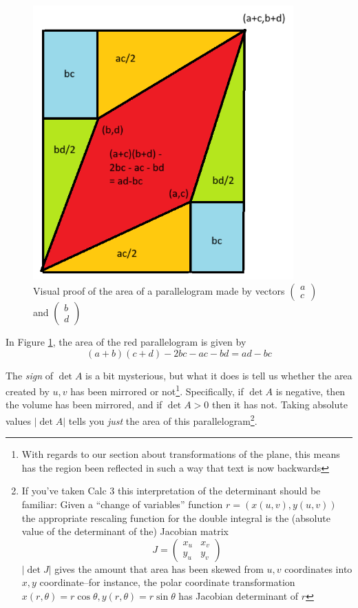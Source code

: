 \documentclass[12pt]{article}
\numberwithin{equation}{subsection}
\numberwithin{figure}{subsection}
\theoremstyle{note}
\begin{document}
\begin{figure}[h!]
\centering 
\includegraphics[width=100mm]{Images/img-2x2-det}
\caption{Visual proof of the area of a parallelogram made by vectors $\begin{pmatrix} a \\ c\end{pmatrix}$ and $\begin{pmatrix} b \\ d \end{pmatrix}$}
\label{fig-2x2-det}
\end{figure}

 In Figure \ref{fig-2x2-det}, the area of the red parallelogram is given by 
\[ (a+ b)(c+d)- 2bc-ac-bd=ad-bc\]

The \textit{sign} of $\det A$ is a bit mysterious, but what it does is tell us whether the area created by $u,v$ has been mirrored or not\footnote{With regards to our section about transformations of the plane, this means has the region been reflected in such a way that text is now backwards}. Specifically, if $\det A$ is negative, then the volume has been mirrored, and if $\det A>0$ then it has not. Taking absolute values $|\det A|$ tells you \textit{just} the area of this parallelogram\footnote{If you've taken Calc 3 this interpretation of the determinant should be familiar: Given a ``change of variables'' function $r=(x(u,v),y(u,v))$ the appropriate rescaling function for the double integral is the (absolute value of the determinant of the) Jacobian matrix \[ J=\begin{pmatrix} x_u & x_v \\ y_u & y_v\end{pmatrix}\] $|\det J|$ gives the amount that area has been skewed from $u,v$ coordinates into $x,y$ coordinate--for instance, the polar coordinate transformation $x(r,\theta) =  r\cos \theta, y(r,\theta)= r\sin \theta$ has Jacobian determinant of $r$}. 
\end{document}
